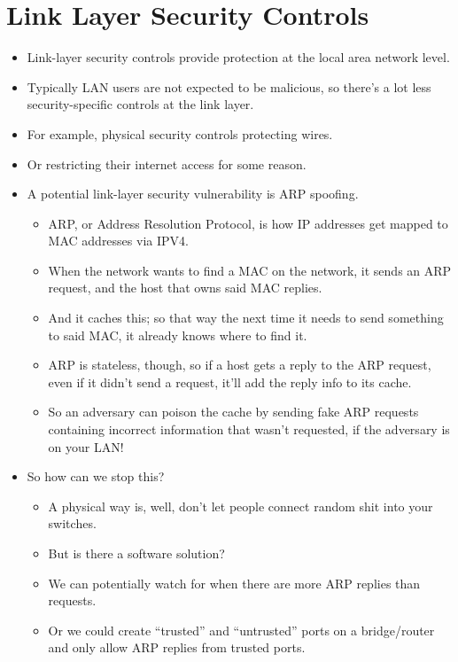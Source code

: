 \documentclass{article}
\begin{document}
\section{Link Layer Security Controls}
\begin{itemize}
    \item Link-layer security controls provide protection at the local area network level.
    \item Typically LAN users are not expected to be malicious, so there's a lot less security-specific controls at the link layer.
    \item For example, physical security controls protecting wires.
    \item Or restricting their internet access for some reason.
    \item A potential link-layer security vulnerability is ARP spoofing.
        \begin{itemize}
            \item ARP, or Address Resolution Protocol, is how IP addresses get mapped to MAC addresses via IPV4.
            \item When the network wants to find a MAC on the network, it sends an ARP request, and the host that owns said MAC replies.
            \item And it caches this; so that way the next time it needs to send something to said MAC, it already knows where to find it.
            \item ARP is stateless, though, so if a host gets a reply to the ARP request, even if it didn't send a request, it'll add the reply info to its cache.
            \item So an adversary can poison the cache by sending fake ARP requests containing incorrect information that wasn't requested, if the adversary is on your LAN!
        \end{itemize}
    \item So how can we stop this?
        \begin{itemize}
            \item A physical way is, well, don't let people connect random shit into your switches.
            \item But is there a software solution?
            \item We can potentially watch for when there are more ARP replies than requests.
            \item Or we could create ``trusted'' and ``untrusted'' ports on a bridge/router and only allow ARP replies from trusted ports.

\end{itemize}
\end{itemize}
\end{document}

